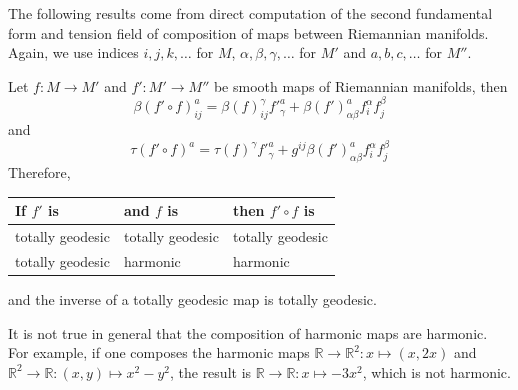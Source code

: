 The following results come from direct computation of the second fundamental form and
tension field of composition of maps between Riemannian manifolds. Again, we use indices
\(i,j,k,\dots\) for \(M\), \(\alpha,\beta,\gamma,\dots\) for \(M'\) and \(a,b,c,\dots\) for \(M''\).

\begin{proposition}
\label{prop:composition-general}
Let \(f: M \longrightarrow M'\) and \(f': M' \longrightarrow M''\) be smooth maps of
Riemannian manifolds, then
\begin{equation}
\label{eq:sff-composition}
\beta(f'\circ f)^a_{ij} = \beta(f)_{ij}^\gamma f'^a_\gamma + \beta(f')_{\alpha\beta}^a f^\alpha_i f^\beta_j
\end{equation}
and
\begin{equation}
\label{eq:tension-field-composition}
\tau(f'\circ f)^a = \tau(f)^\gamma f'^a_\gamma + g^{ij}\beta(f')^a_{\alpha\beta} f^\alpha_i f^\beta_j 
\end{equation}
Therefore,
\begin{center}
\begin{tabular}{lll}
If \(f'\) is & and \(f\)  is & then \(f'\circ f\) is\\
\hline
totally geodesic & totally geodesic & totally geodesic\\
totally geodesic & harmonic & harmonic\\
\end{tabular}
\end{center}
and the inverse of a totally geodesic map is totally geodesic.
\end{proposition}


\begin{remark}
It is not true in general that the composition of harmonic maps are harmonic. For example,
if one composes the harmonic maps \(\mathbb{R} \longrightarrow
\mathbb{R}^2: x \mapsto (x,2x)\) and \(\mathbb{R}^2 \longrightarrow
\mathbb{R}: (x,y)\mapsto x^2 - y^2\), the result is \(\mathbb{R}\longrightarrow \mathbb{R}: x \mapsto -3x^2\),
which is not harmonic.
\end{remark}

